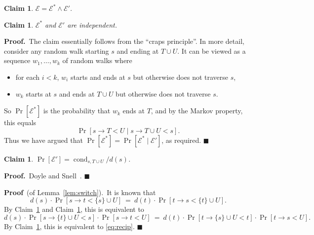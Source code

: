 \documentclass[11pt]{article}
\newcommand{\proofbelow}{8pt}
\numberwithin{equation}{section}
\newtheorem{claim}[theorem]{Claim}
\renewenvironment{proof}{\noindent\textbf{Proof.}\,}{\afterproof}
\newenvironment{proofof}[1]{\noindent\textbf{Proof} \,(of #1).\,}{\afterproof}
\newcommand{\afterproof}{\hfill $\blacksquare$ \par \vspace{\proofbelow}}
\newcommand{\cE}{\mathcal{E}}
\newcommand{\cond}{\operatorname{cond}}
\newcommand{\ClaimName}[1]{\label{clm:#1}}
\newcommand{\Claim}[1]{Claim~\ref{clm:#1}}
\newcommand{\Lemma}[1]{Lemma~\ref{lem:#1}}
\begin{document}
\begin{claim}
\ClaimName{split_xi}
$\cE = \cE^* \wedge \cE'$.
\end{claim}

\begin{claim}
\ClaimName{indep_xi}
$\cE^*$ and $\cE'$ are independent.
\end{claim}
\begin{proof}
The claim essentially follows from the ``craps principle''.
In more detail, consider any random walk starting $s$ and ending at $T \cup U$.
It can be viewed as a sequence $w_1, \ldots, w_k$ of random walks where
\begin{itemize}
\item for each $i<k$, $w_i$ starts and ends at $s$ but otherwise does not traverse $s$,
\item $w_k$ starts at $s$ and ends at $T \cup U$ but otherwise does not traverse $s$.
\end{itemize}
So $\Pr[\cE^*]$ is the probability that $w_k$ ends at $T$,
and by the Markov property, this equals
$$ \Pr[ s \rightarrow T < U \mid s \rightarrow T \cup U < s ]. $$
Thus we have argued that $ \Pr[\cE^*] = \Pr[\cE^* \mid \cE']$, as required.
\end{proof}


\begin{claim}
\ClaimName{split_xi_2}
$\Pr[\cE'] = \cond_{s,T \cup U}/d(s)$.
\end{claim}
\begin{proof}
Doyle and Snell~\cite[\S 1.3.4]{DoyleSnell}.
\end{proof}

\vspace{12pt}

\begin{proofof}{\Lemma{switch}}
It is known \cite[Theorem IX.22]{bollobas} that
$$
    d(s) \cdot \Pr[ s \rightarrow t < \{s\} \cup U ]
    ~=~ d(t) \cdot \Pr[ t \rightarrow s < \{t\} \cup U ].
$$
By \Claim{split_xi} and \Claim{indep_xi}, this is equivalent to
$$
    d(s) \cdot \Pr[ s \rightarrow \{t\} \cup U < s ] \cdot \Pr[ s \rightarrow t < U ]
    ~=~ 
    d(t) \cdot \Pr[ t \rightarrow \{s\} \cup U < t ] \cdot \Pr[ t \rightarrow s < U ].
$$
By \Claim{split_xi_2}, this is equivalent to \eqref{eq:recip}.
\end{proofof}

\vspace{12pt}
\end{document}

